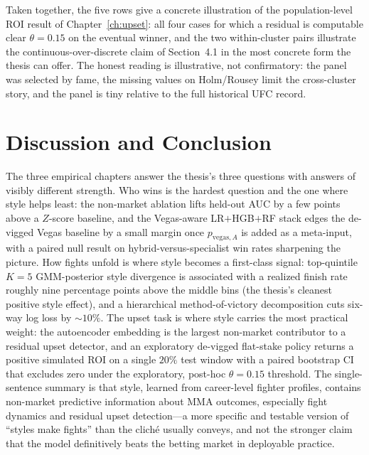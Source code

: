 \documentclass[12pt,oneside]{report}
\begin{document}
Taken together, the five rows give a concrete illustration of the
population-level ROI result of Chapter~\ref{ch:upset}: all four
cases for which a residual is computable clear \(\theta = 0.15\) on
the eventual winner, and the two within-cluster pairs illustrate
the continuous-over-discrete claim of Section~4.1 in the most
concrete form the thesis can offer.  The honest reading is illustrative, not
confirmatory: the panel was selected by fame, the missing values on
Holm/Rousey limit the cross-cluster story, and the panel is tiny
relative to the full historical UFC record.

\chapter{Discussion and Conclusion}\label{ch:conclusion}

The three empirical chapters answer the thesis's three questions
with answers of visibly different strength.  Who wins is the
hardest question and the one where style helps least: the non-market ablation lifts held-out AUC by a few points above a $Z$-score baseline, and the Vegas-aware LR$+$HGB$+$RF stack edges the de-vigged Vegas baseline by a small margin once \(p_{\mathrm{vegas},A}\) is added as a meta-input, with a paired null result on
hybrid-versus-specialist win rates sharpening the picture.
How fights unfold is where style becomes a first-class
signal: top-quintile \(K = 5\) GMM-posterior style divergence is associated with a realized finish rate roughly nine percentage points above the middle bins (the thesis's cleanest
positive style effect), and a hierarchical method-of-victory
decomposition cuts six-way log loss by $\sim 10\%$.  The upset task is where style carries the most practical
weight: the autoencoder embedding is the largest non-market
contributor to a residual upset detector, and an exploratory de-vigged
flat-stake policy returns a positive simulated ROI on a single
$20\%$ test window with a paired bootstrap CI that excludes zero
under the exploratory, post-hoc \(\theta = 0.15\) threshold.  The single-sentence
summary is that style, learned from career-level fighter
profiles, contains non-market predictive information about MMA
outcomes, especially fight dynamics and residual upset detection---a
more specific and testable version of ``styles make fights'' than
the cliché usually conveys, and not the stronger claim that the
model definitively beats the betting market in deployable practice.
\end{document}
